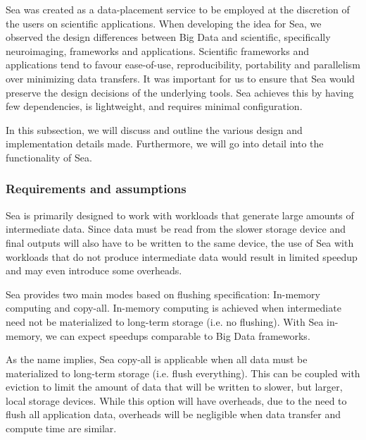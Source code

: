 \documentclass[10pt,journal,compsoc]{IEEEtran}
\begin{document}
Sea was created as a data-placement service to be employed at the discretion of
the users on scientific applications. When developing the idea for Sea, we
observed the design differences between Big Data and scientific, specifically
neuroimaging, frameworks and applications. Scientific frameworks and
applications tend to favour ease-of-use, reproducibility, portability and
parallelism over minimizing data
transfers\cite{jarecka2020pydra,esteban2019fmriprep,wagner2022fairly}. It was
important for us to ensure that Sea would preserve the design decisions of the
underlying tools. Sea achieves this by having few dependencies, is lightweight,
and requires minimal configuration.

In this subsection, we will discuss and outline the various design and
implementation details made. Furthermore, we will go into detail into the
functionality of Sea.

\subsubsection{Requirements and assumptions}

Sea is primarily designed to work with workloads that generate large amounts of
intermediate data. Since data must be read from the slower storage device and final outputs will
also have to be written to the same device, the
use of Sea with workloads that do not produce intermediate data would result in
limited speedup and may even introduce some overheads. 

Sea provides two main modes based on flushing specification: In-memory computing
and copy-all. In-memory computing is achieved when intermediate need not be
materialized to long-term storage (i.e. no flushing). With Sea in-memory, we can
expect speedups comparable to Big Data frameworks.

As the name implies, Sea copy-all is applicable when all data must be
materialized to long-term storage (i.e. flush everything). This can be coupled
with eviction to limit the amount of data that will be written to slower, but
larger, local storage devices. While this option will have overheads, due to the
need to flush all application data, overheads will be negligible when data transfer and compute time
are similar. 

\end{document}
